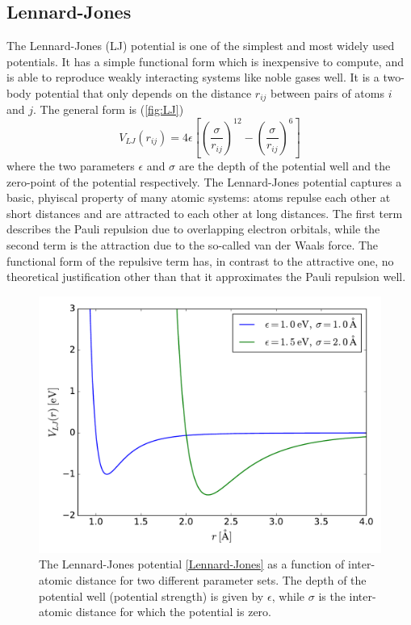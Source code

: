 \documentclass[twoside,english]{uiofysmaster}
\begin{document}
\subsection{Lennard-Jones}
The Lennard-Jones (LJ) potential \cite{Jones24} is one of the simplest and most widely used potentials. 
It has a simple functional form which is inexpensive to compute, and is able to reproduce weakly interacting systems 
like noble gases well. It is a two-body potential that only depends on the distance $r_{ij}$ between pairs of atoms $i$ and $j$. 
The general form is (\autoref{fig:LJ})
\begin{equation}
 V_{LJ}(r_{ij}) = 4\epsilon \left[\left(\frac{\sigma}{r_{ij}}\right)^{12} - \left(\frac{\sigma}{r_{ij}}\right)^6\right]
 \label{Lennard-Jones}
\end{equation}
where the two parameters $\epsilon$ and $\sigma$ are the depth of the potential well and the zero-point of the potential respectively.
The Lennard-Jones potential captures a basic, phyiscal property of many atomic systems: atoms repulse each other at short distances
and are attracted to each other at long distances. The first term describes the Pauli repulsion due to overlapping electron orbitals, 
while the second term is the attraction due to the so-called van der Waals force. 
The functional form of the repulsive term has, in contrast to the attractive one, no theoretical justification other than that
it approximates the Pauli repulsion well. 
\begin{figure}
\begin{center}
 \includegraphics[width = 0.8\linewidth]{Figures/Theory/LJ.pdf}
 \caption{The Lennard-Jones potential \eqref{Lennard-Jones} as a function of inter-atomic distance for two different parameter sets. 
 The depth of the potential well (potential
 strength) is given by $\epsilon$, while $\sigma$ is the inter-atomic distance for which the potential is zero.}
 \label{fig:LJ}
\end{center}
\end{figure}
\end{document}
